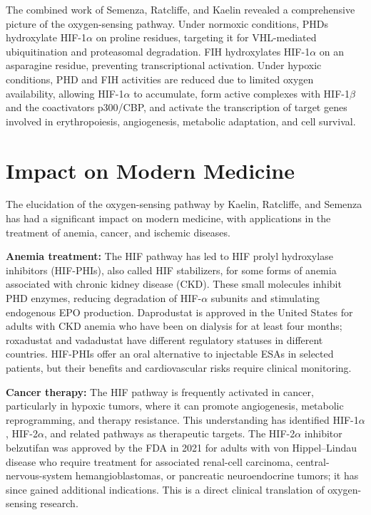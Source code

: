The combined work of Semenza, Ratcliffe, and Kaelin revealed a comprehensive picture of the oxygen-sensing pathway. Under normoxic conditions, PHDs hydroxylate HIF-1$\alpha$ on proline residues, targeting it for VHL-mediated ubiquitination and proteasomal degradation. FIH hydroxylates HIF-1$\alpha$ on an asparagine residue, preventing transcriptional activation. Under hypoxic conditions, PHD and FIH activities are reduced due to limited oxygen availability, allowing HIF-1$\alpha$ to accumulate, form active complexes with HIF-1$\beta$ and the coactivators p300/CBP, and activate the transcription of target genes involved in erythropoiesis, angiogenesis, metabolic adaptation, and cell survival.

\section{Impact on Modern Medicine}

The elucidation of the oxygen-sensing pathway by Kaelin, Ratcliffe, and Semenza has had a significant impact on modern medicine, with applications in the treatment of anemia, cancer, and ischemic diseases.

\textbf{Anemia treatment:} The HIF pathway has led to HIF prolyl hydroxylase inhibitors (HIF-PHIs), also called HIF stabilizers, for some forms of anemia associated with chronic kidney disease (CKD). These small molecules inhibit PHD enzymes, reducing degradation of HIF-$\alpha$ subunits and stimulating endogenous EPO production. Daprodustat is approved in the United States for adults with CKD anemia who have been on dialysis for at least four months; roxadustat and vadadustat have different regulatory statuses in different countries. HIF-PHIs offer an oral alternative to injectable ESAs in selected patients, but their benefits and cardiovascular risks require clinical monitoring.

\textbf{Cancer therapy:} The HIF pathway is frequently activated in cancer, particularly in hypoxic tumors, where it can promote angiogenesis, metabolic reprogramming, and therapy resistance. This understanding has identified HIF-1$\alpha$, HIF-2$\alpha$, and related pathways as therapeutic targets. The HIF-2$\alpha$ inhibitor belzutifan was approved by the FDA in 2021 for adults with von Hippel--Lindau disease who require treatment for associated renal-cell carcinoma, central-nervous-system hemangioblastomas, or pancreatic neuroendocrine tumors; it has since gained additional indications. This is a direct clinical translation of oxygen-sensing research.

